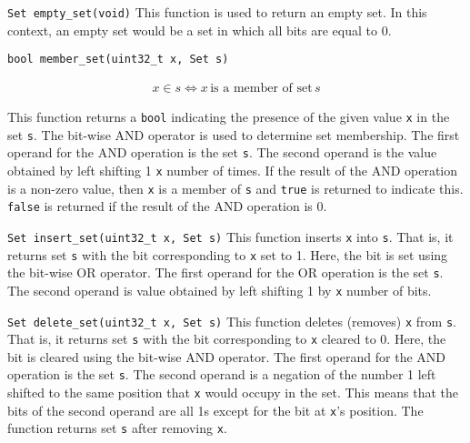 \begin{funcdoc}{\texttt{Set empty\_set(void)}}
  This function is used to return an empty set. In this context, an empty
  set would be a set in which all bits are equal to 0.
\end{funcdoc}

\begin{funcdoc}{\texttt{bool member\_set(uint32\_t x, Set s)}}

\begin{align*}
  x \in s \iff x\, \text{is a member of set}\, s
\end{align*}

  \noindent This function returns a \texttt{bool} indicating the
  presence of the given value \texttt{x} in the set \texttt{s}. The
  bit-wise AND operator is used to determine set membership. The first
  operand for the AND operation is the set \texttt{s}. The second
  operand is the value obtained by left shifting 1 \texttt{x} number of
  times. If the result of the AND operation is a non-zero value, then
  \texttt{x} is a member of \texttt{s} and \texttt{true} is returned to
  indicate this. \texttt{false} is returned if the result of the AND
  operation is 0.
\end{funcdoc}

\begin{funcdoc}{\texttt{Set insert\_set(uint32\_t x, Set s)}}
  This function inserts \texttt{x} into \texttt{s}. That is, it returns
  set \texttt{s} with the bit corresponding to \texttt{x} set to 1.
  Here, the bit is set using the bit-wise OR operator. The first operand
  for the OR operation is the set \texttt{s}. The second operand is
  value obtained by left shifting 1 by \texttt{x} number of bits.
\end{funcdoc}

\begin{funcdoc}{\texttt{Set delete\_set(uint32\_t x, Set s)}}
  This function deletes (removes) \texttt{x} from \texttt{s}. That is,
  it returns set \texttt{s} with the bit corresponding to \texttt{x}
  cleared to 0. Here, the bit is cleared using the bit-wise AND
  operator. The first operand for the AND operation is the set
  \texttt{s}. The second operand is a negation of the number 1 left
  shifted to the same position that \texttt{x} would occupy in the set.
  This means that the bits of the second operand are all 1s except for
  the bit at \texttt{x}'s position. The function returns set \texttt{s}
  after removing \texttt{x}.
\end{funcdoc}


